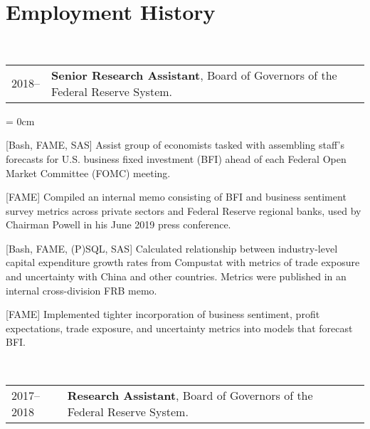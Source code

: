 \documentclass[a4paper, 11pt]{article}
\begin{document}
  \section{Employment History}
    ~\begin{tabular}{llP{15cm}}
      2018-- & \textbf{Senior Research Assistant}, Board of Governors of the Federal Reserve System.
    \end{tabular}

    \begin{compactitem}\parskip = 0cm
      \item {[Bash, FAME, SAS]} Assist group of economists tasked with assembling staff's forecasts for U.S. business fixed investment (BFI) ahead of each Federal Open Market Committee (FOMC) meeting.
      \item {[FAME]} Compiled an internal memo consisting of BFI and business sentiment survey metrics across private sectors and Federal Reserve regional banks, used by Chairman Powell in his June 2019 press conference.
      \item {[Bash, FAME, (P)SQL, SAS]} Calculated relationship between industry-level capital expenditure growth rates from Compustat with metrics of trade exposure and uncertainty with China and other countries. Metrics were published in an internal cross-division FRB memo.
      \item {[FAME]} Implemented tighter incorporation of business sentiment, profit expectations, trade exposure, and uncertainty metrics into models that forecast BFI.
    \end{compactitem}

    \vspace*{1em}

    ~\begin{tabular}{llP{15cm}}
      2017--2018 & \textbf{Research Assistant}, Board of Governors of the Federal Reserve System.
    \end{tabular}
\end{document}
